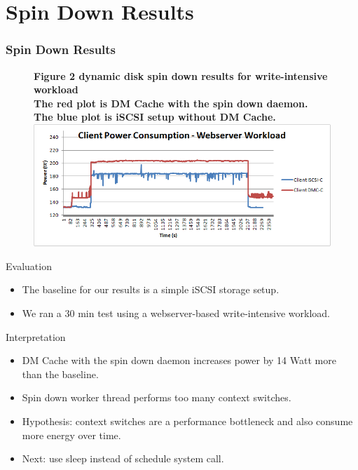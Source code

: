 \documentclass{beamer}
\begin{document}
\section{Spin Down Results}
%
\begin{frame}
    \frametitle{Spin Down Results}
    \begin{figure}
	\raggedright \bf Figure 2 \rm dynamic disk spin down results for write-intensive workload \\
	The red plot is DM Cache with the spin down daemon. The blue plot
	is iSCSI setup without DM Cache. \\
	\vspace{15pt}
	\centering \includegraphics[scale=.45]{image.png}
	\label{fig:results}
    \end{figure}
\end{frame}
\begin{frame}
    \begin{block}{Evaluation}
	\begin{itemize}
	    \item The baseline for our results is a simple iSCSI storage setup.
	    \item We ran a 30 min test using a webserver-based write-intensive workload.
	\end{itemize}
    \end{block}
    \vspace{5pt}
    \begin{block}{Interpretation}
	\begin{itemize}
	    \item DM Cache with the spin down daemon increases power
		by 14 Watt more than the baseline.
	    \item Spin down worker thread performs too many context switches.
	    \item Hypothesis: context switches are a performance
	    	bottleneck and also consume more energy over time.
	    \item Next: use sleep instead of schedule system call.
	\end{itemize}
    \end{block}
\end{frame}
\end{document}
